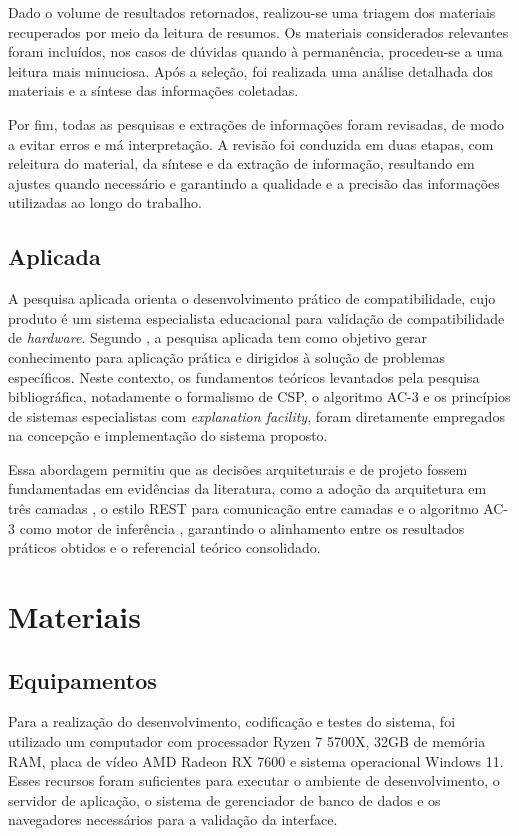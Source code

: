 Dado o volume de resultados retornados, realizou-se uma triagem dos materiais recuperados por meio da leitura de resumos.
Os materiais considerados relevantes foram incluídos, nos casos de dúvidas quando à permanência, procedeu-se a uma leitura
mais minuciosa. Após a seleção, foi realizada uma análise detalhada dos materiais e a síntese das informações coletadas.

Por fim, todas as pesquisas e extrações de informações foram revisadas, de modo a evitar erros e má interpretação. A revisão foi
conduzida em duas etapas, com releitura do material, da síntese e da extração de informação, resultando em ajustes quando
necessário e garantindo a qualidade e a precisão das informações utilizadas ao longo do trabalho.

\subsection{Aplicada}
A pesquisa aplicada orienta o desenvolvimento prático de compatibilidade, cujo produto é um sistema especialista educacional
para validação de compatibilidade de \textit{hardware}. Segundo \textcite{gerhardt2009}, a pesquisa aplicada tem como objetivo
gerar conhecimento para aplicação prática e dirigidos à solução de problemas específicos. Neste contexto, os fundamentos
teóricos levantados pela pesquisa bibliográfica, notadamente o formalismo de CSP, o algoritmo AC-3 e os princípios de
sistemas especialistas com \textit{explanation facility}, foram diretamente empregados na concepção e implementação do
sistema proposto.

Essa abordagem permitiu que as decisões arquiteturais e de projeto fossem fundamentadas em evidências da literatura, como a
adoção da arquitetura em três camadas \cite{Fowler2002}, o estilo REST para comunicação entre camadas \cite{Fielding2000}
e o algoritmo AC-3 como motor de inferência \cite{Mackworth1977}, garantindo o alinhamento entre os resultados práticos
obtidos e o referencial teórico consolidado.

\section{Materiais}
\label{sec:materiais}

\subsection{Equipamentos}
Para a realização do desenvolvimento, codificação e testes do sistema, foi utilizado um computador com processador Ryzen 7 5700X, 32GB de
memória RAM, placa de vídeo AMD Radeon RX 7600 e sistema operacional Windows 11. Esses recursos foram suficientes para executar o ambiente de
desenvolvimento, o servidor de aplicação, o sistema de gerenciador de banco de dados e os navegadores necessários para a validação da
interface.

